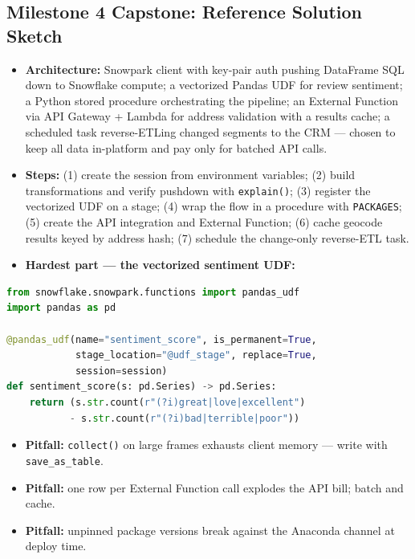 \documentclass[11pt, a4paper]{article}
\begin{document}
\subsection*{Milestone 4 Capstone: Reference Solution Sketch}
\begin{itemize}[label=-, nosep]
    \item \textbf{Architecture:} Snowpark client with key-pair auth pushing DataFrame SQL down to Snowflake compute; a vectorized Pandas UDF for review sentiment; a Python stored procedure orchestrating the pipeline; an External Function via API Gateway + Lambda for address validation with a results cache; a scheduled task reverse-ETLing changed segments to the CRM --- chosen to keep all data in-platform and pay only for batched API calls.
    \item \textbf{Steps:} (1) create the session from environment variables; (2) build transformations and verify pushdown with \texttt{explain()}; (3) register the vectorized UDF on a stage; (4) wrap the flow in a procedure with \texttt{PACKAGES}; (5) create the API integration and External Function; (6) cache geocode results keyed by address hash; (7) schedule the change-only reverse-ETL task.
    \item \textbf{Hardest part --- the vectorized sentiment UDF:}
\end{itemize}
\begin{lstlisting}[language=Python, caption={Vectorized Pandas UDF for sentiment}]
from snowflake.snowpark.functions import pandas_udf
import pandas as pd

@pandas_udf(name="sentiment_score", is_permanent=True,
            stage_location="@udf_stage", replace=True,
            session=session)
def sentiment_score(s: pd.Series) -> pd.Series:
    return (s.str.count(r"(?i)great|love|excellent")
           - s.str.count(r"(?i)bad|terrible|poor"))
\end{lstlisting}
\begin{itemize}[label=-, nosep]
    \item \textbf{Pitfall:} \texttt{collect()} on large frames exhausts client memory --- write with \texttt{save\_as\_table}.
    \item \textbf{Pitfall:} one row per External Function call explodes the API bill; batch and cache.
    \item \textbf{Pitfall:} unpinned package versions break against the Anaconda channel at deploy time.
\end{itemize}
\end{document}
